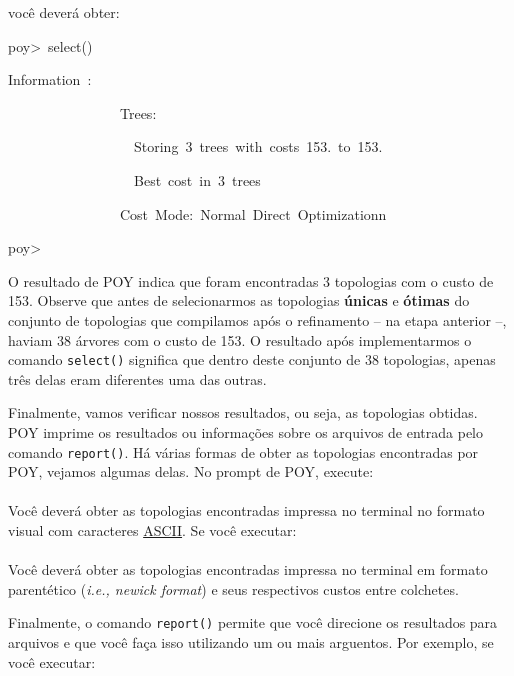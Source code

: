 \begin{refsection}
você deverá obter:\\

\scriptsize

poy>~select()

Information~:~

~~~~~~~~~~~~~~~~Trees:

~~~~~~~~~~~~~~~~~~Storing~3~trees~with~costs~153.~to~153.

~~~~~~~~~~~~~~~~~~Best~cost~in~3~trees~

~~~~~~~~~~~~~~~~Cost~Mode:~Normal~Direct~Optimizationn

poy>~

\normalsize

O resultado de POY indica que foram encontradas 3 topologias com o custo de 153. Observe que antes de selecionarmos as topologias \textbf{únicas} e \textbf{ótimas} do conjunto de topologias que compilamos após o refinamento -- na etapa anterior --, haviam 38 árvores com o custo de 153. O resultado após implementarmos o comando \texttt{select()} significa que dentro deste conjunto de 38 topologias, apenas três delas eram diferentes uma das outras.

Finalmente, vamos verificar nossos resultados, ou seja, as topologias obtidas. POY imprime os resultados ou informações sobre os arquivos de entrada pelo comando \texttt{report()}. Há várias formas de obter as topologias encontradas por POY, vejamos algumas delas. No prompt de POY, execute:\\

\\

Você deverá obter as topologias encontradas impressa no terminal no formato visual com caracteres \href{http://en.wikipedia.org/wiki/ASCII}{ASCII}. Se você executar:\\

\\

Você deverá obter as topologias encontradas impressa no terminal em formato parentético (\textit{i.e., newick format}) e seus respectivos custos entre colchetes.

Finalmente, o comando \texttt{report()} permite que você direcione os resultados para arquivos e que você faça isso utilizando um ou mais arguentos. Por exemplo, se você executar:\\


\\


\end{refsection}
